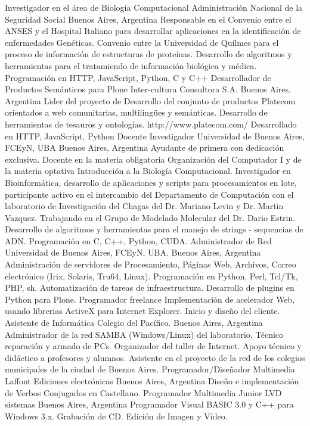 	{Investigador en el área de Biología Computacional}
	{Administración Nacional de la Seguridad Social}
	{Buenos Aires, Argentina}
	{}
	{Responsable en el Convenio entre el ANSES y el Hospital Italiano para desarrollar
	aplicaciones en la identificación de enfermedades Genéticas. Convenio entre la
	Universidad de Quílmes para el proceso de información de estructuras de proteínas.
        Desarrollo de algoritmos y herramientas para el tratamiendo de información biológica y médica.
        Programación en HTTP, JavaScript, Python, C y C++}
	{Desarrollador de Productos Semánticos para Plone}
	{Inter-cultura Consultora S.A.}
	{Buenos Aires, Argentina}
	{}
	{Lider del proyecto de Desarrollo del conjunto de productos Platecom
	orientados a web comunitarias, multilingües y semánticas. Desarrollo
	de herramientas de tesauros y ontologías. http://www.platecom.com/
        Desarrollado en HTTP, JavaScript, Python}
	{Docente Investigador}
	{Universidad de Buenos Aires, FCEyN, UBA}
	{Buenos Aires, Argentina}
	{}
	{Ayudante de primera con dedicación exclusiva.
	Docente en la materia obligatoria Organización del Computador I y de la
	materia optativa Introducción a la Biología Computacional.
	Investigador en Bioinformática, desarrollo de aplicaciones y scripts para
	procesamientos en lote, participante activo en el intercambio del Departamento
	de Computación con el laboratorio de Investigación del Chagas del
	Dr. Mariano Levin y Dr. Martin Vazquez. Trabajando en el Grupo de Modelado Molecular
	del Dr. Dario Estrin.
        Desarrollo de algoritmos y herramientas para el manejo de strings - sequencias de ADN.
        Programación en C, C++, Python, CUDA.}
	{Administrador de Red}
	{Universidad de Buenos Aires, FCEyN, UBA.}
	{Buenos Aires, Argentina}
	{}
	{Administración de servidores de Procesamiento, Páginas Web,
	Archivos, Correo electrónico (Irix, Solaris, Tru64, Linux).
	Programación en Python, Perl, Tcl/Tk, PHP, sh.
	Automatización de tareas de infraestructura.
        Desarrollo de plugins en Python para Plone.}
	{Programador freelance}
	{}
	{}
	{}
	{Implementación de acelerador Web, usando librerias ActiveX para Internet Explorer. Inicio y diseño del cliente.}
	{Asistente de Informática}
	{Colegio del Pacífico.}
	{Buenos Aires, Argentina}
	{}
	{Administrador de la red SAMBA (Windows/Linux) del
	laboratorio. Técnico reparación y armado de PCs. Organizador del taller de
	Internet. Apoyo técnico y didáctico a profesores y alumnos. Asistente en el
	proyecto de la red de los colegios municipales de la ciudad de Buenos Aires.}
	{Programador/Diseñador Multimedia}
	{Laffont Ediciones electrónicas}
	{Buenos Aires, Argentina}
	{}
	{Diseño e implementación de Verbos Conjugados en Castellano.}
	{Programador Multimedia Junior}
	{LVD sistemas}
	{Buenos Aires, Argentina}
	{}
	{Programador Visual BASIC 3.0 y C++ para Windows 3.x. Grabación de CD. Edición de Imagen y Vídeo.}



